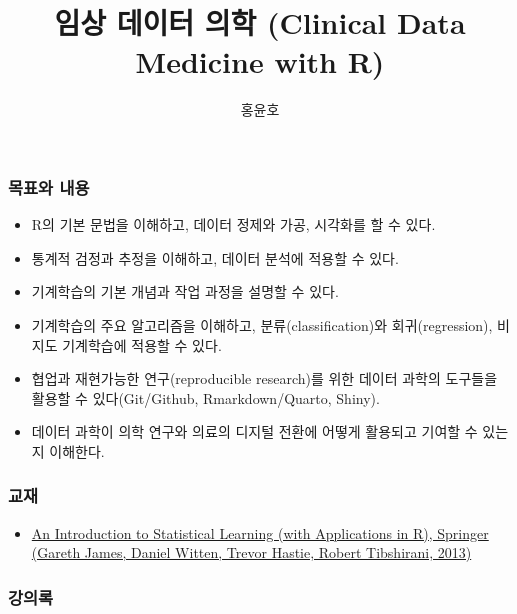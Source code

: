 \documentclass[
]{article}
\title{임상 데이터 의학 (Clinical Data Medicine with R)}
\author{홍윤호}
\date{}
\providecommand{\tightlist}{%
  \setlength{\itemsep}{0pt}\setlength{\parskip}{0pt}}
\begin{document}
\maketitle

\hypertarget{uxbaa9uxd45cuxc640-uxb0b4uxc6a9}{%
\subsubsection{목표와 내용}\label{uxbaa9uxd45cuxc640-uxb0b4uxc6a9}}

\begin{itemize}
\tightlist
\item
  R의 기본 문법을 이해하고, 데이터 정제와 가공, 시각화를 할 수 있다.~
\item
  통계적 검정과 추정을 이해하고, 데이터 분석에 적용할 수 있다.~
\item
  기계학습의 기본 개념과 작업 과정을 설명할 수 있다.~
\item
  기계학습의 주요 알고리즘을 이해하고, 분류(classification)와
  회귀(regression), 비지도 기계학습에 적용할 수 있다.~
\item
  협업과 재현가능한 연구(reproducible research)를 위한 데이터 과학의
  도구들을 활용할 수 있다(Git/Github, Rmarkdown/Quarto, Shiny).~
\item
  데이터 과학이 의학 연구와 의료의 디지털 전환에 어떻게 활용되고 기여할
  수 있는지 이해한다.~
\end{itemize}

\hypertarget{uxad50uxc7ac}{%
\subsubsection{교재}\label{uxad50uxc7ac}}

\begin{itemize}
\tightlist
\item
  \href{https://www-bcf.usc.edu/~gareth/ISL/}{An Introduction to
  Statistical Learning (with Applications in R), Springer (Gareth James,
  Daniel Witten, Trevor Hastie, Robert Tibshirani, 2013)}
\end{itemize}

\hypertarget{uxac15uxc758uxb85d}{%
\subsubsection{강의록}\label{uxac15uxc758uxb85d}}
\end{document}

